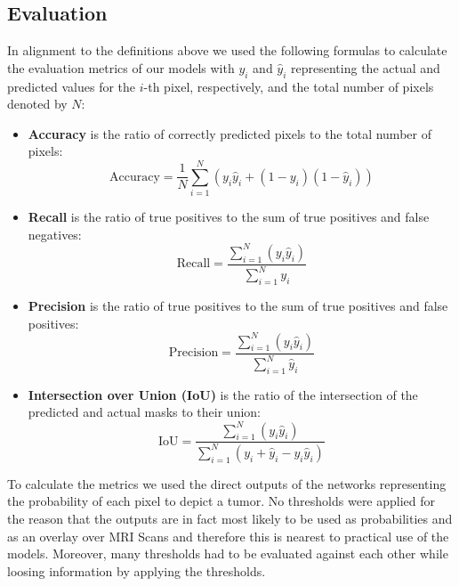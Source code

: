 \documentclass[lettersize,journal]{IEEEtran}
\begin{document}
\subsection{Evaluation}
In alignment to the definitions above we used the following formulas to calculate the evaluation metrics of our models with \( y_i \) and \( \hat{y}_i \) representing the actual and predicted values for the \(i\)-th pixel, respectively, and the total number of pixels denoted by \( N \):
\begin{itemize}
  \item \textbf{Accuracy} is the ratio of correctly predicted pixels to the total number of pixels:
  \begin{equation}
  \text{Accuracy} = \frac{1}{N} \sum_{i=1}^{N} \left( y_i \hat{y}_i + (1 - y_i) (1 - \hat{y}_i) \right)
  \end{equation}
  
  \item \textbf{Recall} is the ratio of true positives to the sum of true positives and false negatives:
  \begin{equation}
  \text{Recall} = \frac{\sum_{i=1}^{N} (y_i \hat{y}_i)}{\sum_{i=1}^{N} y_i}
  \end{equation}
  
  \item \textbf{Precision} is the ratio of true positives to the sum of true positives and false positives:
  \begin{equation}
  \text{Precision} = \frac{\sum_{i=1}^{N} (y_i \hat{y}_i)}{\sum_{i=1}^{N} \hat{y}_i}
  \end{equation}
  
  \item \textbf{Intersection over Union (IoU)} is the ratio of the intersection of the predicted and actual masks to their union:
  \begin{equation}
  \text{IoU} = \frac{\sum_{i=1}^{N} (y_i \hat{y}_i)}{\sum_{i=1}^{N} \left( y_i + \hat{y}_i - y_i \hat{y}_i \right)}
  \end{equation}
\end{itemize}

To calculate the metrics we used the direct outputs of the networks representing the probability of each pixel to depict a tumor. No thresholds were applied for the reason that the outputs are in fact most likely to be used as probabilities and as an overlay over MRI Scans and therefore this is nearest to practical use of the models. Moreover, many thresholds had to be evaluated against each other while loosing information by applying the thresholds.  
\end{document}
